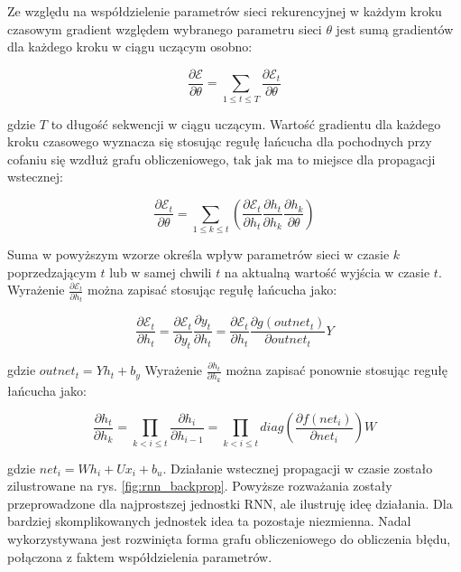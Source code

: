 \documentclass[oneside, mag]{mgr}
\begin{document}
Ze względu na współdzielenie parametrów sieci rekurencyjnej w każdym kroku czasowym gradient względem wybranego parametru sieci $\theta$ jest sumą gradientów dla każdego kroku w ciągu uczącym osobno:

\begin{equation}
	\frac{\partial \mathcal{E}}{\partial \theta} = \sum_{1 \leq t \leq T} \frac{\partial \mathcal{E}_t}{\partial \theta}
\end{equation}

gdzie $T$ to długość sekwencji w ciągu uczącym. Wartość gradientu dla każdego kroku czasowego wyznacza się stosując regułę łańcucha dla pochodnych przy cofaniu się wzdłuż grafu obliczeniowego, tak jak ma to miejsce dla propagacji wstecznej:

\begin{equation}
	\frac{\partial \mathcal{E}_t}{\partial \theta} = \sum_{1 \leq k \leq t} (\frac{\partial \mathcal{E}_t}{\partial h_t} \frac{\partial h_t}{\partial h_k} \frac{\partial h_k}{\partial \theta})
\end{equation}

Suma w powyższym wzorze określa wpływ parametrów sieci w czasie $k$ poprzedzającym $t$ lub w samej chwili $t$ na aktualną wartość wyjścia w czasie $t$. Wyrażenie $\frac{\partial \mathcal{E}_t}{\partial h_t}$ można zapisać stosując regułę łańcucha jako:

\begin{equation}
	\frac{\partial \mathcal{E}_t}{\partial h_t} = \frac{\partial \mathcal{E}_t}{\partial y_t} \frac{\partial y_t}{\partial h_t} = \frac{\partial \mathcal{E}_t}{\partial h_t} \frac{\partial g(outnet_t)}{\partial outnet_t} Y
\end{equation}

gdzie $outnet_t = Y h_t + b_y$ Wyrażenie $\frac{\partial h_t}{\partial h_k}$ można zapisać ponownie stosując regułę łańcucha jako:

\begin{equation}
	\frac{\partial h_t}{\partial h_k} = \prod_{k < i \leq t} \frac{\partial h_i}{\partial h_{i-1}} = \prod_{k < i \leq t} diag( \frac{\partial f(net_i)}{\partial net_i}) W
\label{eq:BPTT_product}
\end{equation}

gdzie $net_i = W h_i + U x_i + b_u$. Działanie wstecznej propagacji w czasie zostało zilustrowane na rys. \ref{fig:rnn_backprop}. Powyższe rozważania zostały przeprowadzone dla najprostszej jednostki RNN, ale ilustruję ideę działania. Dla bardziej skomplikowanych jednostek idea ta pozostaje niezmienna. Nadal wykorzystywana jest rozwinięta forma grafu obliczeniowego do obliczenia błędu, połączona z faktem współdzielenia parametrów. 
\end{document}
